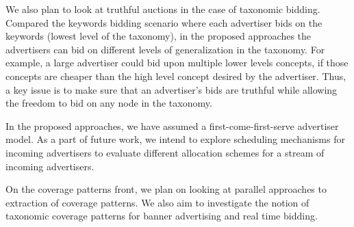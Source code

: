 We also plan to look at truthful auctions in the case of taxonomic bidding. Compared the keywords bidding scenario where each advertiser bids on the keywords (lowest level of the taxonomy), in the proposed approaches the advertisers can bid on different levels of generalization in the taxonomy. For example, a large advertiser could bid upon multiple lower levels concepts, if those concepts are cheaper than the high level concept desired by the advertiser. Thus, a key issue is to make sure that an advertiser's bids are truthful while allowing the freedom to bid on any node in the taxonomy. 

In the proposed approaches, we have assumed a first-come-first-serve advertiser model. As a part of future work, we intend to explore scheduling mechanisms for incoming advertisers to evaluate different allocation schemes for a stream of incoming advertisers.

On the coverage patterns front, we plan on looking at parallel approaches to extraction of coverage patterns. We also aim to investigate the notion of taxonomic coverage patterns for banner advertising and real time bidding.
